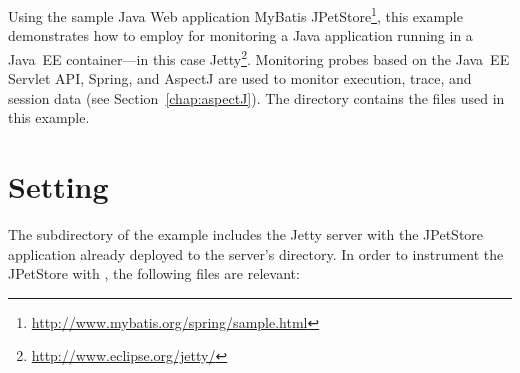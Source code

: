 Using the sample Java Web application %
MyBatis JPetStore\footnote{\url{http://www.mybatis.org/spring/sample.html}}, this example %
demonstrates how to employ \KiekerMonitoringPart{} for monitoring a Java application %
running in a Java~EE container---in this case Jetty\footnote{\url{http://www.eclipse.org/jetty/}}. %
Monitoring probes based on the Java~EE Servlet API, Spring, %
and AspectJ are used to monitor execution, trace, and session data (see Section~\ref{chap:aspectJ}). %
The directory \dir{\JavaEEServletExampleDistro/} contains the files used in this %
example. 

\section{Setting}

The subdirectory  of the example includes the %
Jetty server with the JPetStore application already deployed to the server's %
 directory. In order to instrument the JPetStore with %
\KiekerMonitoringPart{}, the following files are relevant:

